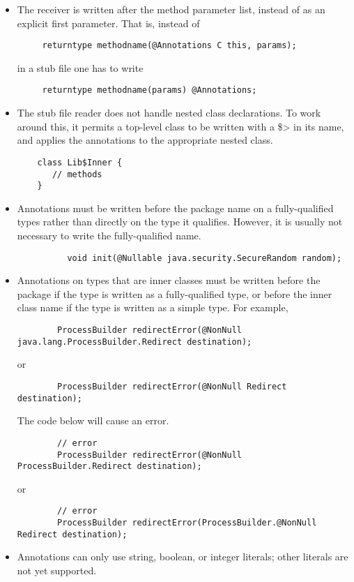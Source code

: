 \begin{itemize}

\item
  The receiver is written after the method parameter list, instead of as an
  explicit first parameter.  That is, instead of

\begin{Verbatim}
     returntype methodname(@Annotations C this, params);
\end{Verbatim}

\noindent
in a stub file one has to write

\begin{Verbatim}
     returntype methodname(params) @Annotations;
\end{Verbatim}

\item
  The stub file reader
  does not handle nested class declarations.  To work around this, it permits a
  top-level class to be written with a \<\$> in its name, and applies the
  annotations to the appropriate nested class.

\begin{Verbatim}
    class Lib$Inner {
       // methods
    }
\end{Verbatim}

\item
  Annotations must be written before the package name on a fully-qualified
  types rather than directly on the type it qualifies.  However, it is usually not
  necessary to write the fully-qualified name.

  \begin{Verbatim}
          void init(@Nullable java.security.SecureRandom random);
   \end{Verbatim}
\item
   Annotations on types that are inner classes must be written before the
   package if the type is written as a
   fully-qualified type, or before the inner class name if the type is
   written as a simple type. For example,

\begin{Verbatim}
        ProcessBuilder redirectError(@NonNull java.lang.ProcessBuilder.Redirect destination);
\end{Verbatim}
 or
\begin{Verbatim}
        ProcessBuilder redirectError(@NonNull Redirect destination);
\end{Verbatim}
   The code below will cause an error.
\begin{Verbatim}
        // error
        ProcessBuilder redirectError(@NonNull ProcessBuilder.Redirect destination);
\end{Verbatim}
 or
\begin{Verbatim}
        // error
        ProcessBuilder redirectError(ProcessBuilder.@NonNull Redirect destination);
\end{Verbatim}

\item
  Annotations can only use string, boolean, or integer literals; other literals are not
  yet supported.
\end{itemize}

